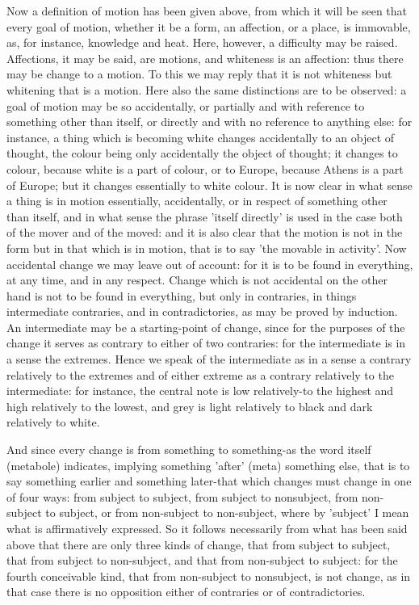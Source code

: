Now a definition of motion has been given above, from which it will
be seen that every goal of motion, whether it be a form, an affection,
or a place, is immovable, as, for instance, knowledge and heat. Here,
however, a difficulty may be raised. Affections, it may be said, are
motions, and whiteness is an affection: thus there may be change to
a motion. To this we may reply that it is not whiteness but whitening
that is a motion. Here also the same distinctions are to be observed:
a goal of motion may be so accidentally, or partially and with reference
to something other than itself, or directly and with no reference
to anything else: for instance, a thing which is becoming white changes
accidentally to an object of thought, the colour being only accidentally
the object of thought; it changes to colour, because white is a part
of colour, or to Europe, because Athens is a part of Europe; but it
changes essentially to white colour. It is now clear in what sense
a thing is in motion essentially, accidentally, or in respect of something
other than itself, and in what sense the phrase 'itself directly'
is used in the case both of the mover and of the moved: and it is
also clear that the motion is not in the form but in that which is
in motion, that is to say 'the movable in activity'. Now accidental
change we may leave out of account: for it is to be found in everything,
at any time, and in any respect. Change which is not accidental on
the other hand is not to be found in everything, but only in contraries,
in things intermediate contraries, and in contradictories, as may
be proved by induction. An intermediate may be a starting-point of
change, since for the purposes of the change it serves as contrary
to either of two contraries: for the intermediate is in a sense the
extremes. Hence we speak of the intermediate as in a sense a contrary
relatively to the extremes and of either extreme as a contrary relatively
to the intermediate: for instance, the central note is low relatively-to
the highest and high relatively to the lowest, and grey is light relatively
to black and dark relatively to white. 

And since every change is from something to something-as the word
itself (metabole) indicates, implying something 'after' (meta) something
else, that is to say something earlier and something later-that which
changes must change in one of four ways: from subject to subject,
from subject to nonsubject, from non-subject to subject, or from non-subject
to non-subject, where by 'subject' I mean what is affirmatively expressed.
So it follows necessarily from what has been said above that there
are only three kinds of change, that from subject to subject, that
from subject to non-subject, and that from non-subject to subject:
for the fourth conceivable kind, that from non-subject to nonsubject,
is not change, as in that case there is no opposition either of contraries
or of contradictories. 

